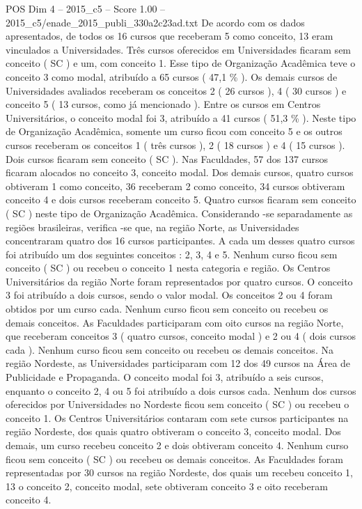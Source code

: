 \begin{textsample}{POS Dim 4 – 2015\_c5 – Score 1.00 – 2015\_c5/enade\_2015\_publi\_330a2c23ad.txt}
De acordo com os dados apresentados, de todos os 16 cursos que receberam 5 como conceito, 13 eram vinculados a Universidades.
Três cursos oferecidos em Universidades ficaram sem conceito ( SC ) e um, com conceito 1.
Esse tipo de Organização Acadêmica teve o conceito 3 como modal, atribuído a 65 cursos ( 47,1 \% ).
Os demais cursos de Universidades avaliados receberam os conceitos 2 ( 26 cursos ), 4 ( 30 cursos ) e conceito 5 ( 13 cursos, como já mencionado ).
Entre os cursos em Centros Universitários, o conceito modal foi 3, atribuído a 41 cursos ( 51,3 \% ).
Neste tipo de Organização Acadêmica, somente um curso ficou com conceito 5 e os outros cursos receberam os conceitos 1 ( três cursos ), 2 ( 18 cursos ) e 4 ( 15 cursos ).
Dois cursos ficaram sem conceito ( SC ).
Nas Faculdades, 57 dos 137 cursos ficaram alocados no conceito 3, conceito modal.
Dos demais cursos, quatro cursos obtiveram 1 como conceito, 36 receberam 2 como conceito, 34 cursos obtiveram conceito 4 e dois cursos receberam conceito 5.
Quatro cursos ficaram sem conceito ( SC ) neste tipo de Organização Acadêmica.
Considerando -se separadamente as regiões brasileiras, verifica -se que, na região Norte, as Universidades concentraram quatro dos 16 cursos participantes.
A cada um desses quatro cursos foi atribuído um dos seguintes conceitos : 2, 3, 4 e 5.
Nenhum curso ficou sem conceito ( SC ) ou recebeu o conceito 1 nesta categoria e região.
Os Centros Universitários da região Norte foram representados por quatro cursos.
O conceito 3 foi atribuído a dois cursos, sendo o valor modal.
Os conceitos 2 ou 4 foram obtidos por um curso cada.
Nenhum curso ficou sem conceito ou recebeu os demais conceitos.
As Faculdades participaram com oito cursos na região Norte, que receberam conceitos 3 ( quatro cursos, conceito modal ) e 2 ou 4 ( dois cursos cada ).
Nenhum curso ficou sem conceito ou recebeu os demais conceitos.
Na região Nordeste, as Universidades participaram com 12 dos 49 cursos na Área de Publicidade e Propaganda.
O conceito modal foi 3, atribuído a seis cursos, enquanto o conceito 2, 4 ou 5 foi atribuído a dois cursos cada.
Nenhum dos cursos oferecidos por Universidades no Nordeste ficou sem conceito ( SC ) ou recebeu o conceito 1.
Os Centros Universitários contaram com sete cursos participantes na região Nordeste, dos quais quatro obtiveram o conceito 3, conceito modal.
Dos demais, um curso recebeu conceito 2 e dois obtiveram conceito 4.
Nenhum curso ficou sem conceito ( SC ) ou recebeu os demais conceitos.
As Faculdades foram representadas por 30 cursos na região Nordeste, dos quais um recebeu conceito 1, 13 o conceito 2, conceito modal, sete obtiveram conceito 3 e oito receberam conceito 4.

\end{textsample}
